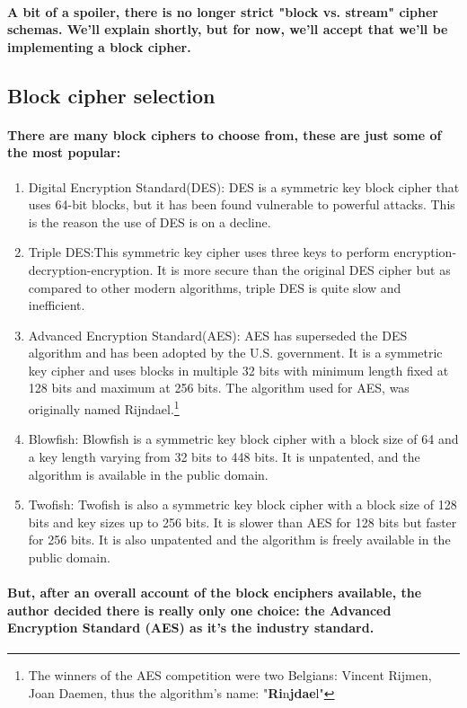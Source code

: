 \paragraph{A bit of a spoiler, there is no longer strict "block vs. stream" cipher schemas. We'll explain shortly, but for now, we'll accept that we'll be implementing a block cipher.}

\subsection{Block cipher selection}
\paragraph{There are many block ciphers to choose from, these are just some of the most popular:}\cite{Nirula}
\begin{enumerate}
\item Digital Encryption Standard(DES): DES is a symmetric key block cipher that uses 64-bit blocks, but it has been found vulnerable to powerful attacks. This is the reason the use of DES is on a decline. 
\item Triple DES:This symmetric key cipher uses three keys to perform encryption-decryption-encryption. It is more secure than the original DES cipher but as compared to other modern algorithms, triple DES is quite slow and inefficient. 
\item Advanced Encryption Standard(AES): AES has superseded the DES algorithm and has been adopted by the U.S. government. It is a symmetric key cipher and uses blocks in multiple 32 bits with minimum length fixed at 128 bits and maximum at 256 bits. The algorithm used for AES, was originally named Rijndael.\footnote{The winners of the AES competition were two Belgians: Vincent Rijmen, Joan Daemen, thus the algorithm's name: "\textbf{Ri}n\textbf{jdae}l"}
\item Blowfish: Blowfish is a symmetric key block cipher with a block size of 64 and a key length varying from 32 bits to 448 bits. It is unpatented, and the algorithm is available in the public domain. 
\item Twofish: Twofish is also a symmetric key block cipher with a block size of 128 bits and key sizes up to 256 bits. It is slower than AES for 128 bits but faster for 256 bits. It is also unpatented and the algorithm is freely available in the public domain.
\end{enumerate}

\paragraph{But, after an overall account of the block enciphers available, the author decided there is really only one choice: the Advanced Encryption Standard (AES) as it's the industry standard.}

